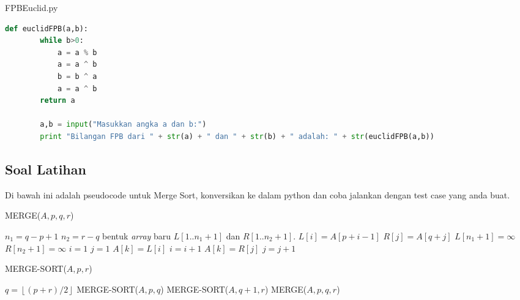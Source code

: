 \begin{IDE}
	\begin{listprog}{FPBEuclid.py}
		\label{lst:tulisTeksPython}
		\begin{lstlisting}[language=Python]
		def euclidFPB(a,b):
	    while b>0:
	        a = a % b 
	        a = a ^ b
	        b = b ^ a 
	        a = a ^ b 
	    return a

		a,b = input("Masukkan angka a dan b:")
		print "Bilangan FPB dari " + str(a) + " dan " + str(b) + " adalah: " + str(euclidFPB(a,b))		
		\end{lstlisting}
	\end{listprog}
\end{IDE}

\subsection{Soal Latihan}

\begin{latihan}
Di bawah ini adalah pseudocode untuk Merge Sort, konversikan ke dalam python dan coba jalankan dengan test case yang anda buat.

\begin{algorithm}[H]
	\caption{MERGE($A,p,q,r$)}
	\label{algo:merge}
	\begin{algorithmic}[1]
		\STATE $n_1 = q - p + 1$
		\STATE $n_2 = r - q$
		\STATE bentuk \textit{array} baru $L[1..n_1+1]$ dan $R[1..n_2+1]$.
			\STATE $L[i] = A[p+i-1]$
		\ENDFOR
			\STATE $R[j] = A[q+j]$
		\ENDFOR
		\STATE $L[n_1+1] = \infty$
		\STATE $R[n_2+1] = \infty$
		\STATE $i=1$
		\STATE $j=1$
				\STATE $A[k] = L[i]$
				\STATE $i = i +1$
			\ELSE
				\STATE $A[k]=R[j]$
				\STATE $j=j+1$
			\ENDIF
		\ENDFOR
	\end{algorithmic}
\end{algorithm}

\begin{algorithm}[H]
	\caption{MERGE-SORT($A,p,r$)}
	\label{algo:mergeSort}
	\begin{algorithmic}[1]
		\IF{$p<r$}
			\STATE $q = \left\lfloor{}(p+r)/2\right\rfloor$
			\STATE MERGE-SORT($A,p,q$)
			\STATE MERGE-SORT($A,q+1,r$)
			\STATE MERGE($A,p,q,r$) 
		\ENDIF
	\end{algorithmic}
\end{algorithm}

\end{latihan}
